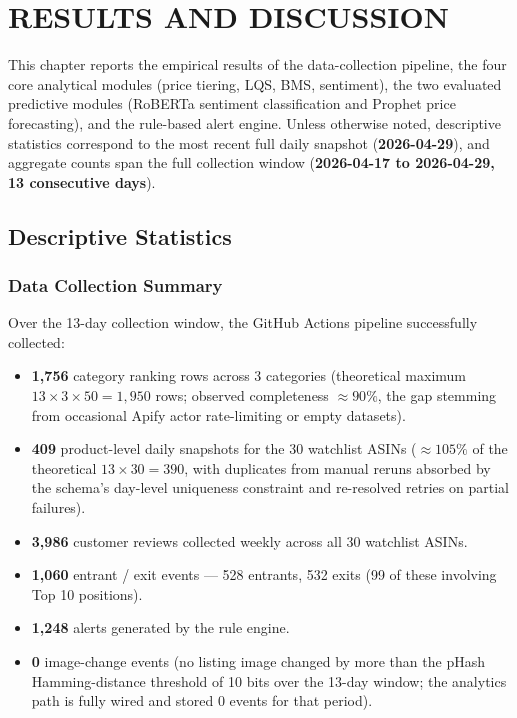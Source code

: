 \chapter{RESULTS AND DISCUSSION}
\label{chap:results}

This chapter reports the empirical results of the data-collection pipeline,
the four core analytical modules (price tiering, LQS, BMS, sentiment), the
two evaluated predictive modules (RoBERTa sentiment classification and
Prophet price forecasting), and the rule-based alert engine. Unless otherwise
noted, descriptive statistics correspond to the most recent full daily
snapshot (\textbf{2026-04-29}), and aggregate counts span the full
collection window (\textbf{2026-04-17 to 2026-04-29, 13 consecutive days}).

\section{Descriptive Statistics}

\subsection{Data Collection Summary}

Over the 13-day collection window, the GitHub Actions pipeline successfully
collected:

\begin{itemize}
  \item \textbf{1{,}756} category ranking rows across 3 categories
  (theoretical maximum $13 \times 3 \times 50 = 1{,}950$ rows; observed
  completeness $\approx 90\%$, the gap stemming from occasional Apify actor
  rate-limiting or empty datasets).
  \item \textbf{409} product-level daily snapshots for the 30 watchlist
  ASINs ($\approx 105\%$ of the theoretical $13 \times 30 = 390$, with
  duplicates from manual reruns absorbed by the schema's day-level uniqueness
  constraint and re-resolved retries on partial failures).
  \item \textbf{3{,}986} customer reviews collected weekly across all 30
  watchlist ASINs.
  \item \textbf{1{,}060} entrant / exit events --- 528 entrants, 532 exits
  (99 of these involving Top 10 positions).
  \item \textbf{1{,}248} alerts generated by the rule engine.
  \item \textbf{0} image-change events (no listing image
  changed by more than the pHash Hamming-distance threshold of 10 bits over
  the 13-day window; the analytics path is fully wired and stored 0
  events for that period).
\end{itemize}


